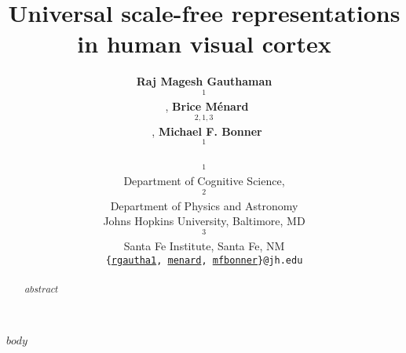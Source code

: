 \documentclass[10pt]{article}
\title{Universal scale-free representations\\in human visual cortex}
\author{
    \textbf{Raj Magesh Gauthaman$$^1$$}~\orcidlink{0000-0001-7121-1532},
    \textbf{Brice Ménard$$^{2,1,3}$$}~\orcidlink{0000-0003-3164-6974},
    \textbf{Michael F. Bonner$$^1$$}~\orcidlink{0000-0002-4992-674X}\\
    $$^1$$Department of Cognitive Science,
    $$^2$$Department of Physics and Astronomy\\
    Johns Hopkins University, Baltimore, MD\\
    $$^3$$Santa Fe Institute, Santa Fe, NM\\
    \texttt{\{\href{mailto:rgautha1@jh.edu}{rgautha1}, \href{mailto:bmenard1@jh.edu}{menard}, \href{mailto:mfbonner@jh.edu}{mfbonner}\}@jh.edu}
}
\date{}
\begin{document}
\maketitle

\begin{abstract}
    $abstract$
\end{abstract}

$body$

\newpage
\printbibliography
\end{document}
